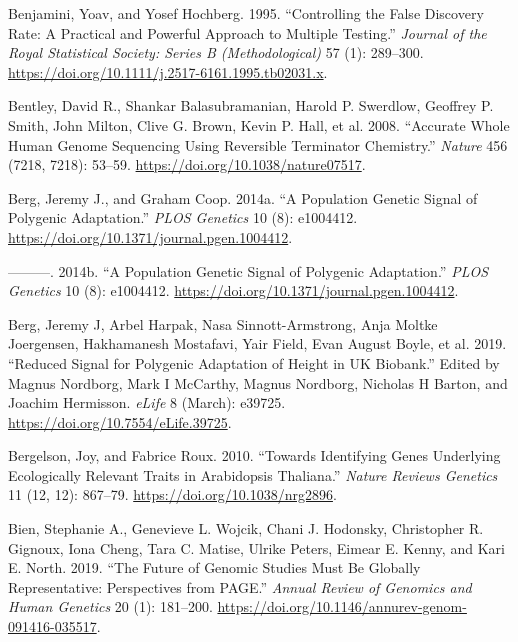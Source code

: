 \documentclass[
]{book}
\newlength{\cslhangindent}
\newlength{\cslentryspacingunit} %
\newenvironment{CSLReferences}[2] %
 {%
  \setlength{\parindent}{0pt}
  \ifodd #1
  \let\oldpar\par
  \def\par{\hangindent=\cslhangindent\oldpar}
  \fi
  \setlength{\parskip}{#2\cslentryspacingunit}
 }%
 {}
\begin{document}
\begin{CSLReferences}{1}{0}
\leavevmode{}%
Benjamini, Yoav, and Yosef Hochberg. 1995. {``Controlling the {False Discovery Rate}: {A Practical} and {Powerful Approach} to {Multiple Testing}.''} \emph{Journal of the Royal Statistical Society: Series B (Methodological)} 57 (1): 289--300. \url{https://doi.org/10.1111/j.2517-6161.1995.tb02031.x}.

\leavevmode{}%
Bentley, David R., Shankar Balasubramanian, Harold P. Swerdlow, Geoffrey P. Smith, John Milton, Clive G. Brown, Kevin P. Hall, et al. 2008. {``Accurate Whole Human Genome Sequencing Using Reversible Terminator Chemistry.''} \emph{Nature} 456 (7218, 7218): 53--59. \url{https://doi.org/10.1038/nature07517}.

\leavevmode{}%
Berg, Jeremy J., and Graham Coop. 2014a. {``A {Population Genetic Signal} of {Polygenic Adaptation}.''} \emph{PLOS Genetics} 10 (8): e1004412. \url{https://doi.org/10.1371/journal.pgen.1004412}.

\leavevmode{}%
---------. 2014b. {``A {Population Genetic Signal} of {Polygenic Adaptation}.''} \emph{PLOS Genetics} 10 (8): e1004412. \url{https://doi.org/10.1371/journal.pgen.1004412}.

\leavevmode{}%
Berg, Jeremy J, Arbel Harpak, Nasa Sinnott-Armstrong, Anja Moltke Joergensen, Hakhamanesh Mostafavi, Yair Field, Evan August Boyle, et al. 2019. {``Reduced Signal for Polygenic Adaptation of Height in {UK Biobank}.''} Edited by Magnus Nordborg, Mark I McCarthy, Magnus Nordborg, Nicholas H Barton, and Joachim Hermisson. \emph{eLife} 8 (March): e39725. \url{https://doi.org/10.7554/eLife.39725}.

\leavevmode{}%
Bergelson, Joy, and Fabrice Roux. 2010. {``Towards Identifying Genes Underlying Ecologically Relevant Traits in {Arabidopsis} Thaliana.''} \emph{Nature Reviews Genetics} 11 (12, 12): 867--79. \url{https://doi.org/10.1038/nrg2896}.

\leavevmode{}%
Bien, Stephanie A., Genevieve L. Wojcik, Chani J. Hodonsky, Christopher R. Gignoux, Iona Cheng, Tara C. Matise, Ulrike Peters, Eimear E. Kenny, and Kari E. North. 2019. {``The {Future} of {Genomic Studies Must Be Globally Representative}: {Perspectives} from {PAGE}.''} \emph{Annual Review of Genomics and Human Genetics} 20 (1): 181--200. \url{https://doi.org/10.1146/annurev-genom-091416-035517}.


\end{CSLReferences}
\end{document}
